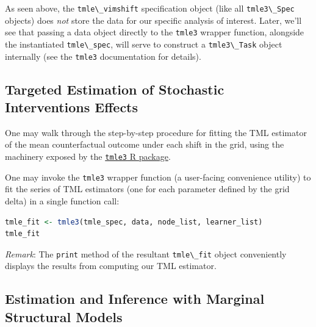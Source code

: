 \documentclass[
  12pt, krantz2,
]{krantz}
\newcommand{\passthrough}[1]{#1}
\theoremstyle{definition}
\theoremstyle{definition}
\theoremstyle{definition}
\newcommand{\1}{\mathbbm{1}}
\begin{document}
As seen above, the \passthrough{\lstinline!tmle\_vimshift!} specification object (like all \passthrough{\lstinline!tmle3\_Spec!}
objects) does \emph{not} store the data for our specific analysis of interest. Later,
we'll see that passing a data object directly to the \passthrough{\lstinline!tmle3!} wrapper function,
alongside the instantiated \passthrough{\lstinline!tmle\_spec!}, will serve to construct a \passthrough{\lstinline!tmle3\_Task!}
object internally (see the \passthrough{\lstinline!tmle3!} documentation for details).

\hypertarget{targeted-estimation-of-stochastic-interventions-effects-1}{%
\subsection{Targeted Estimation of Stochastic Interventions Effects}\label{targeted-estimation-of-stochastic-interventions-effects-1}}

One may walk through the step-by-step procedure for fitting the TML estimator
of the mean counterfactual outcome under each shift in the grid, using the
machinery exposed by the \href{https://tmle3.tlverse.org/}{\passthrough{\lstinline!tmle3!} R package}.

One may invoke the \passthrough{\lstinline!tmle3!} wrapper function (a user-facing convenience utility)
to fit the series of TML estimators (one for each parameter defined by the grid
delta) in a single function call:

\begin{lstlisting}[language=R]
tmle_fit <- tmle3(tmle_spec, data, node_list, learner_list)
tmle_fit
\end{lstlisting}

\emph{Remark}: The \passthrough{\lstinline!print!} method of the resultant \passthrough{\lstinline!tmle\_fit!} object conveniently
displays the results from computing our TML estimator.

\hypertarget{estimation-and-inference-with-marginal-structural-models}{%
\subsection{Estimation and Inference with Marginal Structural Models}\label{estimation-and-inference-with-marginal-structural-models}}
\end{document}
